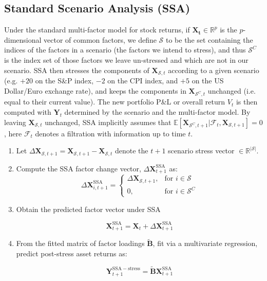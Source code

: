 \documentclass[11pt]{article}
\theoremstyle{plain}
\theoremstyle{definition}
\theoremstyle{remark}
\numberwithin{equation}{section}
\begin{document}
\subsection{Standard Scenario Analysis (SSA)}
\label{app:ssa}
Under the standard multi-factor model for stock returns, if $\mathbf{X_t} \in \mathbb{R}^p$ is the $p$-dimensional vector of common factors, we define $\mathcal{S}$ to be the set containing the indices of the factors in a scenario (the factors we intend to stress), and thus $\mathcal{S}^C$ is the index set of those factors we leave un-stressed and which are not in our scenario. SSA then stresses the components of $\mathbf{X}_{\mathcal{S},t}$ according to a given scenario (e.g. $+20$ on the S\&P index, $-2$ on the CPI index, and $+5$ on the US Dollar/Euro exchange rate), and keeps the components in $\mathbf{X}_{\mathcal{S}^C,t}$ unchanged (i.e. equal to their current value). The new portfolio P\&L or overall return $V_t$ is then computed with $\mathbf{Y}_t$ determined by the scenario and the multi-factor model. By leaving $\mathbf{X}_{\mathcal{S},t}$ unchanged, SSA implicitly assumes that $\mathbb{E}[\mathbf{X}_{\mathcal{S}^C, t+1}|\mathcal{F}_t, \mathbf{X}_{\mathcal{S}, t+1}]= 0$, here $\mathcal{F}_t$ denotes a filtration with information up to time $t$. 
\begin{enumerate}

\item Let $\Delta \mathbf{X}_{\mathcal{S}, t+1}=\mathbf{X}_{\mathcal{S},t+1}-\mathbf{X}_{\mathcal{S}, t}$ denote the $t+1$ scenario stress vector $\in \mathbb{R}^{|\mathcal{S}|}$. 

\item Compute the SSA factor change vector, $\Delta \mathbf{X}^{\mathrm{SSA}}_{t+1}$ as:
\[
\Delta \mathbf{X}^{\mathrm{SSA}}_{i, t+1} =
\begin{cases}
    \Delta \mathbf{X}_{\mathcal{S},t+1}, & \text{for } i \in \mathcal{S}  \\
    0, & \text{for } i \in \mathcal{S}^C 
\end{cases}
\]

\item Obtain the predicted factor vector under SSA 

\[\mathbf{X}_{t+1}^{\mathrm{SSA}}=\mathbf{X}_t+\Delta\mathbf{X}^{\mathrm{SSA}}_{t+1}\]

\item From the fitted matrix of factor loadings $\mathbf{\tilde{B}}$, fit via a multivariate regression, predict post-stress asset returns as:

\[\mathbf{Y}^{\mathrm{SSA-stress}}_{t+1}=\tilde{\mathbf{B}} \mathbf{X}_{t+1}^{\mathrm{SSA}}\]

\end{enumerate}
\end{document}
